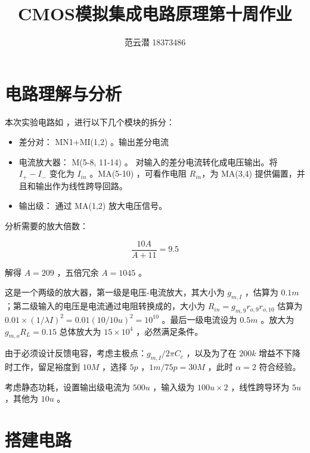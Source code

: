 \documentclass[lang=cn,11pt,a4paper,cite=authoryear]{elegantpaper}
\title{CMOS模拟集成电路原理\quad 第十周作业}
\author{范云潜 18373486}
\institute{微电子学院 184111 班}
\date{\zhtoday}
\begin{document}
\maketitle


\tableofcontents

\listoffigures


\section{电路理解与分析}

本次实验电路如  ，进行以下几个模块的拆分：

\begin{itemize}
    \item 差分对： MN1+MI(1,2) 。输出差分电流
    \item 电流放大器： M(5-8, 11-14) 。 对输入的差分电流转化成电压输出。将 \(I_{+} - I_{-}\) 变化为 \(I_{in}\) 。MA(5-10) ，可看作电阻 \(R_{in}\)，为 MA(3,4) 提供偏置，并且和输出作为线性跨导回路。
    \item 输出级： 通过 MA(1,2) 放大电压信号。
\end{itemize}





分析需要的放大倍数： 

\[\frac{10 A}{A + 11} = 9.5\]

解得 \(A = 209\) ，五倍冗余 \(A = 1045\) 。


这是一个两级的放大器，第一级是电压-电流放大，其大小为 \(g_{m,I}\) ，估算为 \(0.1 m\)；第二级输入的电压是电流通过电阻转换成的，大小为 \(R_{in} = g_{m,9} r_{o,9} r_{o,10} \) 估算为 \(0.01 \times (1/\lambda I)^2 = 0.01 (10 / 10u)^2 = 10^{10} \) 。最后一级电流设为 \(0.5 m\) 。放大为 \(g_{m,o} R_L = 0.15\) 总体放大为 \(15 \times 10^4\) ，必然满足条件。

由于必须设计反馈电容，考虑主极点：\(g_{m,I} / 2 \pi C_c\) ，以及为了在 \(200 k\) 增益不下降时工作，留足裕度到 \(10 M\) ，选择 \(5 p\) ，\(1m / 7 5p  = 30 M\) ，此时 \(\alpha = 2\) 符合经验。

考虑静态功耗，设置输出级电流为 \(500 u\) ，输入级为 \(100 u \times 2\) ，线性跨导环为 \(5 u\) ，其他为 \(10 u\) 。

\section{搭建电路} 
\end{document}
